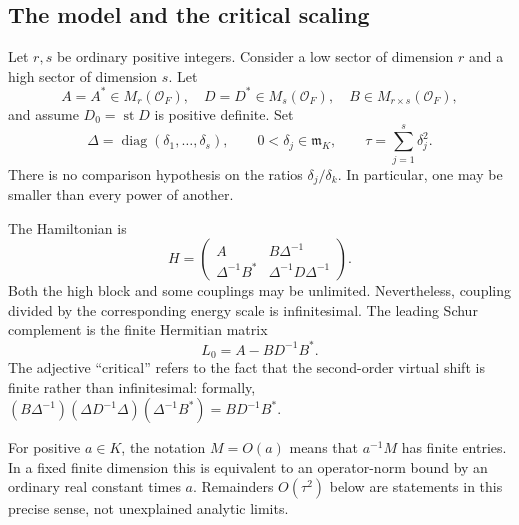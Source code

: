 \documentclass[11pt,oneside]{article}
\numberwithin{equation}{section}
\theoremstyle{plain}
\theoremstyle{definition}
\theoremstyle{remark}
\newcommand{\OO}{\mathcal O}
\newcommand{\mm}{\mathfrak m}
\newcommand{\st}{\operatorname{st}}
\newcommand{\diag}{\operatorname{diag}}
\begin{document}
\subsection{The model and the critical scaling}
Let $r,s$ be ordinary positive integers. Consider a low sector of dimension $r$ and a high sector of dimension $s$. Let
\[
 A=A^*\in M_r(\OO_F),\quad
 D=D^*\in M_s(\OO_F),\quad
 B\in M_{r\times s}(\OO_F),
\]
and assume $D_0=\st D$ is positive definite. Set
\begin{equation}\label{eq:Delta}
 \Delta=\diag(\delta_1,\ldots,\delta_s),
 \qquad 0<\delta_j\in\mm_K,
 \qquad \tau=\sum_{j=1}^s\delta_j^2.
\end{equation}
There is no comparison hypothesis on the ratios $\delta_j/\delta_k$. In particular, one may be smaller than every power of another.

The Hamiltonian is
\begin{equation}\label{eq:criticalH}
 H=\begin{pmatrix}
 A&B\Delta^{-1}\\
 \Delta^{-1}B^*&\Delta^{-1}D\Delta^{-1}
 \end{pmatrix}.
\end{equation}
Both the high block and some couplings may be unlimited. Nevertheless, coupling divided by the corresponding energy scale is infinitesimal. The leading Schur complement is the finite Hermitian matrix
\begin{equation}\label{eq:Kzero}
 L_0=A-BD^{-1}B^*.
\end{equation}
The adjective ``critical'' refers to the fact that the second-order virtual shift is finite rather than infinitesimal: formally, $(B\Delta^{-1})(\Delta D^{-1}\Delta)(\Delta^{-1}B^*)=BD^{-1}B^*$.

For positive $a\in K$, the notation $M=O(a)$ means that $a^{-1}M$ has finite entries. In a fixed finite dimension this is equivalent to an operator-norm bound by an ordinary real constant times $a$. Remainders $O(\tau^2)$ below are statements in this precise sense, not unexplained analytic limits.
\end{document}

